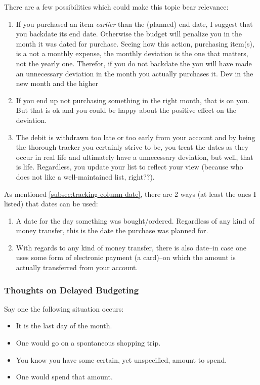 There are a few possibilities which could make this topic bear relevance:
\begin{enumerate}
	\item If you purchased an item \emph{earlier} than the (planned) end date, I suggest that you backdate its end date.
	Otherwise the budget will penalize you in the month it was dated for purchase.
	Seeing how this action, \ie purchasing item(s), is a not a monthly expense, the monthly deviation is the one that matters, not the yearly one.
	Therefor, if you do not backdate the you will have made an unnecessary deviation in the month you actually purchases it.
	Dev in the new month and the higher 
	\item If you end up not purchasing something in the right month, that is on you.
	But that is ok and you could be happy about the positive effect on the deviation.
	\item The debit is withdrawn too late or too early from your account and by being the thorough tracker you certainly strive to be, you treat the dates as they occur in real life and ultimately have a unnecessary deviation, but well, that is life.
	Regardless, you update your list to reflect your view 	(because who does not like a well-maintained list, right??).
\end{enumerate}

As mentioned \autoref{subsec:tracking-column-date}, there are 2 ways (at least the ones I listed) that dates can be used:
\begin{enumerate}
	\item A date for the day something was bought/ordered.
	Regardless of any kind of money transfer, this is the date the purchase was planned for.
	\item With regards to any kind of money transfer, there is also date--in case one uses some form of electronic payment (\eg a card)--on which the amount is actually transferred from your account.
\end{enumerate}

\subsubsection{Thoughts on Delayed Budgeting}
\label{subsubsec:thoughts-delayed-budgeting}

Say one the following situation occurs:
\begin{itemize}
	\item It is the last day of the month.
	\item One would go on a spontaneous shopping trip.
	\item You know you have some certain, yet unspecified, amount to spend.
	\item One would spend that amount.
\end{itemize}

